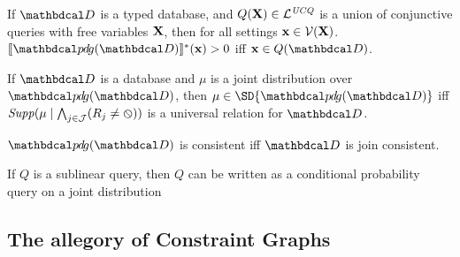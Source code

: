 \documentclass[the-pdg-manual.tex]{subfiles}
\begin{document}
\begin{prop}
  If $\D$ is a typed database, and $Q(\mathbf X) \in \mathcal L^{\mathit{UCQ}}$ is a union of conjunctive queries with free variables $\mathbf X$, then
  for all settings $\mathbf x \in \mathcal V(\mathbf X)$.
  $\bbr{\PDGof{\D}}^{*}(\mat x) > 0$ iff $\mat x \in Q(\D)$.
\end{prop}


\begin{prop}
    If $\D$ is a database and $\mu$ is a joint distribution over $\PDGof{\D}$, then
    $\mu \in \SD{\PDGof{\D}}$ iff $\mathit{Supp}(\mu\mid \bigwedge_{j \in \mathcal J}( R_j \ne \varobslash)) $ is a universal relation for $\D$.
\end{prop}
\begin{coro}
    $\PDGof{\D}$ is consistent iff $\D$ is join consistent.
\end{coro}

\begin{inactive}
\begin{prop}
    If $Q$ is a sublinear query, then $Q$ can be written as a conditional probability query
    on a joint distribution 
\end{prop}
\end{inactive}


\subsection{The allegory of Constraint Graphs}
\end{document}
